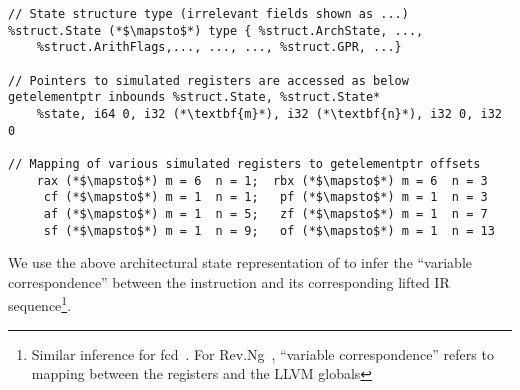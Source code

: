 \begin{lstlisting}[style=KRULE]
// State structure type (irrelevant fields shown as ...)
%struct.State (*$\mapsto$*) type { %struct.ArchState, ..., 
    %struct.ArithFlags,..., ..., ..., %struct.GPR, ...}

// Pointers to simulated registers are accessed as below
getelementptr inbounds %struct.State, %struct.State* 
    %state, i64 0, i32 (*\textbf{m}*), i32 (*\textbf{n}*), i32 0, i32 0

// Mapping of various simulated registers to getelementptr offsets
    rax (*$\mapsto$*) m = 6  n = 1;  rbx (*$\mapsto$*) m = 6  n = 3
     cf (*$\mapsto$*) m = 1  n = 1;   pf (*$\mapsto$*) m = 1  n = 3
     af (*$\mapsto$*) m = 1  n = 5;   zf (*$\mapsto$*) m = 1  n = 7
     sf (*$\mapsto$*) m = 1  n = 9;   of (*$\mapsto$*) m = 1  n = 13
\end{lstlisting}

We use the above architectural state representation of \mcsema to infer the
``variable correspondence'' between the \ISA instruction and its corresponding
lifted IR sequence\footnote{Similar inference
    for fcd~\cite{FCD}. For Rev.Ng~\cite{DiFederico:CC2017}, ``variable
    correspondence''  refers to  mapping between the \ISA registers and the
    LLVM globals}.

%
%

 

